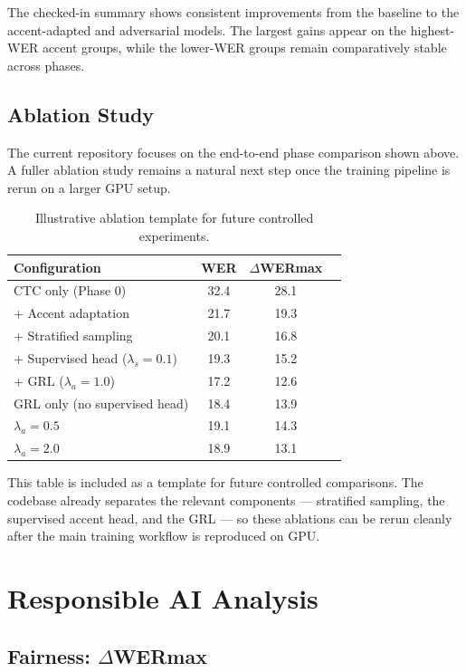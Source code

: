 \documentclass[10pt,twocolumn,letterpaper]{article}
\begin{document}
The checked-in summary shows consistent improvements from the baseline to the accent-adapted and adversarial models. The largest gains appear on the highest-WER accent groups, while the lower-WER groups remain comparatively stable across phases.

\subsection{Ablation Study}

The current repository focuses on the end-to-end phase comparison shown above. A fuller ablation study remains a natural next step once the training pipeline is rerun on a larger GPU setup.

\begin{table}[h]
\centering
\caption{Illustrative ablation template for future controlled experiments.}
\label{tab:ablation}
\begin{tabular}{lccc}
\toprule
\textbf{Configuration} & \textbf{WER} & \textbf{$\Delta$WERmax} \\
\midrule
CTC only (Phase 0) & 32.4 & 28.1 \\
+ Accent adaptation & 21.7 & 19.3 \\
+ Stratified sampling & 20.1 & 16.8 \\
+ Supervised head ($\lambda_s=0.1$) & 19.3 & 15.2 \\
+ GRL ($\lambda_a=1.0$) & 17.2 & 12.6 \\
\midrule
GRL only (no supervised head) & 18.4 & 13.9 \\
$\lambda_a = 0.5$ & 19.1 & 14.3 \\
$\lambda_a = 2.0$ & 18.9 & 13.1 \\
\bottomrule
\end{tabular}
\end{table}

This table is included as a template for future controlled comparisons. The codebase already separates the relevant components --- stratified sampling, the supervised accent head, and the GRL --- so these ablations can be rerun cleanly after the main training workflow is reproduced on GPU.

\section{Responsible AI Analysis}

\subsection{Fairness: $\Delta$WERmax}
\end{document}
